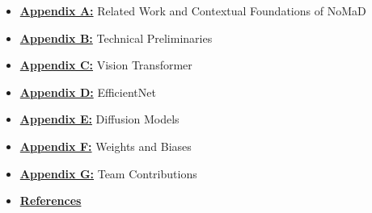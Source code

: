 \documentclass[12pt]{article}
\begin{document}
\begin{appendices}
\begin{itemize}
    \item \hyperref[app:related_work]{\textbf{Appendix A:}} Related Work and Contextual Foundations of NoMaD
    \item \hyperref[app:preliminaries]{\textbf{Appendix B:}} Technical Preliminaries
    \item \hyperref[app:vit]{\textbf{Appendix C:}} Vision Transformer
    \item \hyperref[app:efficientnet]{\textbf{Appendix D:}} EfficientNet
    \item \hyperref[app:diffusion]{\textbf{Appendix E:}} Diffusion Models
    \item \hyperref[app:wandb]{\textbf{Appendix F:}} Weights and Biases
    \item \hyperref[app:team_contributions]{\textbf{Appendix G:}} Team Contributions
    \item \hyperref[references]{\textbf{References}}
\end{itemize}

\end{appendices}
\end{document}

